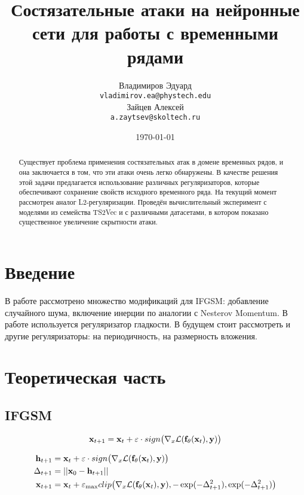 \documentclass[a4paper, 14pt]{article}
\title{Состязательные атаки на нейронные сети для работы с временными рядами}
\author{Владимиров Эдуард \\
	\texttt{vladimirov.ea@phystech.edu} \\
	\And
	Зайцев Алексей \\
	\texttt{a.zaytsev@skoltech.ru}
}
\date{\today}
\begin{document}
	\maketitle
	
	\begin{abstract}
		Существует проблема применения состязательных атак в домене временных рядов, и она заключается в том, что эти атаки очень легко обнаружены. В качестве решения этой задачи предлагается использование различных регуляризаторов, которые обеспечивают сохранение свойств исходного временного ряда. На текущий момент рассмотрен аналог L2-регуляризации. Проведён вычислительный эксперимент с моделями из семейства TS2Vec и с различными датасетами, в котором показано существенное увеличение скрытности атаки.
	\end{abstract}
	
	
	\section{Введение}
	В работе \cite{vivek2020regularizers} рассмотрено множество модификаций для IFGSM: добавление случайного шума, включение инерции по аналогии с Nesterov Momentum.
	В работе \cite{pialla2023time} используется регуляризатор гладкости.
	В будущем стоит рассмотреть и другие регуляризаторы: на периодичность, на размерность вложения.
	
	\section{Теоретическая часть}

	\subsection{IFGSM}
	$$ \mathbf{x}_{t+1} = \mathbf{x}_t + \varepsilon \cdot sign \bigl( \nabla_x \mathcal{L} (\mathbf{f}_\theta(\mathbf{x}_t), \mathbf{y}) \bigr) $$
	
	\begin{align*}
		\mathbf{h}_{t+1} &= \mathbf{x}_t + \varepsilon \cdot sign \bigl( \nabla_x \mathcal{L} (\mathbf{f}_\theta(\mathbf{x}_t), \mathbf{y}) \bigr) \\
		\Delta_{t+1} &= || \mathbf{x}_0 - \mathbf{h}_{t+1} || \\
		\mathbf{x}_{t+1} &= \mathbf{x}_t + \varepsilon_{\max} clip \bigl( \nabla_x \mathcal{L} (\mathbf{f}_\theta(\mathbf{x}_t), \mathbf{y}), -\exp(-\Delta_{t+1}^2), \exp(-\Delta_{t+1}^2) \bigr)
	\end{align*}
	
\end{document}
